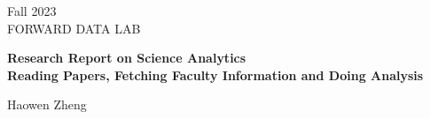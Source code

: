 \documentclass[a4paper,11pt]{article}
\begin{document}
\begin{titlepage}
    \centering
    {\Huge\Large Fall 2023\\\Large FORWARD DATA LAB}

    \vspace{6cm}

    {\Huge\bfseries Research Report on Science Analytics \\\Large Reading Papers, Fetching Faculty Information and Doing Analysis}

    \vfill

    {Haowen Zheng}
\end{titlepage}








\end{document}
